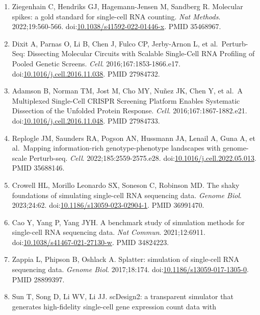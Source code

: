 \documentclass[11pt]{article}
\begin{document}
\begin{enumerate}
  IC, et al.~Power analysis of single-cell RNA-sequencing experiments.
  \emph{Nat Methods}. 2017;14:381-387.
  doi:\href{https://doi.org/10.1038/nmeth.4220}{10.1038/nmeth.4220}.
  PMID 28263961.
\item
  Ziegenhain C, Hendriks GJ, Hagemann-Jensen M, Sandberg R. Molecular
  spikes: a gold standard for single-cell RNA counting. \emph{Nat
  Methods}. 2022;19:560-566.
  doi:\href{https://doi.org/10.1038/s41592-022-01446-x}{10.1038/s41592-022-01446-x}.
  PMID 35468967.
\item
  Dixit A, Parnas O, Li B, Chen J, Fulco CP, Jerby-Arnon L, et
  al.~Perturb-Seq: Dissecting Molecular Circuits with Scalable
  Single-Cell RNA Profiling of Pooled Genetic Screens. \emph{Cell}.
  2016;167:1853-1866.e17.
  doi:\href{https://doi.org/10.1016/j.cell.2016.11.038}{10.1016/j.cell.2016.11.038}.
  PMID 27984732.
\item
  Adamson B, Norman TM, Jost M, Cho MY, Nuñez JK, Chen Y, et al.~A
  Multiplexed Single-Cell CRISPR Screening Platform Enables Systematic
  Dissection of the Unfolded Protein Response. \emph{Cell}.
  2016;167:1867-1882.e21.
  doi:\href{https://doi.org/10.1016/j.cell.2016.11.048}{10.1016/j.cell.2016.11.048}.
  PMID 27984733.
\item
  Replogle JM, Saunders RA, Pogson AN, Hussmann JA, Lenail A, Guna A, et
  al.~Mapping information-rich genotype-phenotype landscapes with
  genome-scale Perturb-seq. \emph{Cell}. 2022;185:2559-2575.e28.
  doi:\href{https://doi.org/10.1016/j.cell.2022.05.013}{10.1016/j.cell.2022.05.013}.
  PMID 35688146.
\item
  Crowell HL, Morillo Leonardo SX, Soneson C, Robinson MD. The shaky
  foundations of simulating single-cell RNA sequencing data.
  \emph{Genome Biol}. 2023;24:62.
  doi:\href{https://doi.org/10.1186/s13059-023-02904-1}{10.1186/s13059-023-02904-1}.
  PMID 36991470.
\item
  Cao Y, Yang P, Yang JYH. A benchmark study of simulation methods for
  single-cell RNA sequencing data. \emph{Nat Commun}. 2021;12:6911.
  doi:\href{https://doi.org/10.1038/s41467-021-27130-w}{10.1038/s41467-021-27130-w}.
  PMID 34824223.
\item
  Zappia L, Phipson B, Oshlack A. Splatter: simulation of single-cell
  RNA sequencing data. \emph{Genome Biol}. 2017;18:174.
  doi:\href{https://doi.org/10.1186/s13059-017-1305-0}{10.1186/s13059-017-1305-0}.
  PMID 28899397.
\item
  Sun T, Song D, Li WV, Li JJ. scDesign2: a transparent simulator that
  generates high-fidelity single-cell gene expression count data with

\end{enumerate}
\end{document}
